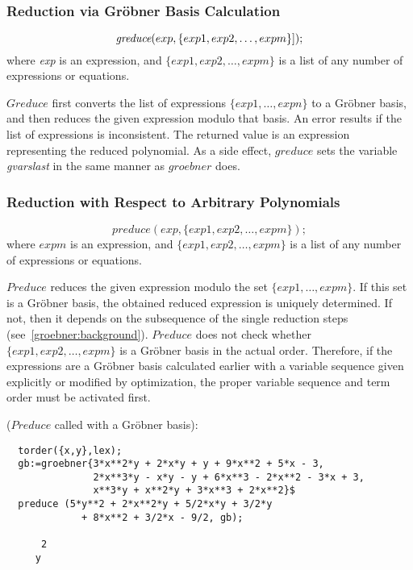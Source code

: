 \subsubsection{Reduction via Gr\"obner Basis Calculation}
\[
\mbox{\it  greduce}(exp, \{exp1, exp2, \ldots , expm\}]);
\]
where {\it exp} is an expression, and $\{exp1, exp2,\ldots , expm\}$ is
a list of any number of expressions or equations.

$Greduce$ first converts the list of expressions $\{exp1, \ldots ,
expn\}$ to a Gr\"obner basis, and then reduces the given expression
modulo that basis.  An error results if the list of expressions is
inconsistent. The returned value is an expression representing the
reduced polynomial. As a side effect, $greduce$ sets the variable {\it
gvarslast} in the same manner as $groebner$ does.

\subsubsection{Reduction with Respect to Arbitrary Polynomials}
\[
 preduce(exp, \{exp1, exp2,\ldots , expm\});
\]
where $ expm $  is an expression, and $\{exp1, exp2, \ldots ,
expm \}$ is a list of any number of expressions or equations.

$Preduce$ reduces the given expression modulo the set $\{exp1,
\ldots , expm\}$. If this set is a Gr\"obner basis, the obtained reduced
expression is uniquely determined. If not, then it depends on the
subsequence of the single reduction steps
(see~\ref{groebner:background}). $Preduce$ does not check whether
$\{exp1, exp2, \ldots , expm\}$ is a Gr\"obner basis in the actual
order. Therefore, if the expressions are a Gr\"obner basis calculated
earlier with a variable sequence given explicitly or modified by
optimization, the proper variable sequence and term order must
be activated first.

\example ($Preduce$ called with a Gr\"obner basis):
\begin{verbatim}
  torder({x,y},lex);
  gb:=groebner{3*x**2*y + 2*x*y + y + 9*x**2 + 5*x - 3,
               2*x**3*y - x*y - y + 6*x**3 - 2*x**2 - 3*x + 3,
               x**3*y + x**2*y + 3*x**3 + 2*x**2}$
  preduce (5*y**2 + 2*x**2*y + 5/2*x*y + 3/2*y
             + 8*x**2 + 3/2*x - 9/2, gb);

      2
     y
\end{verbatim}

